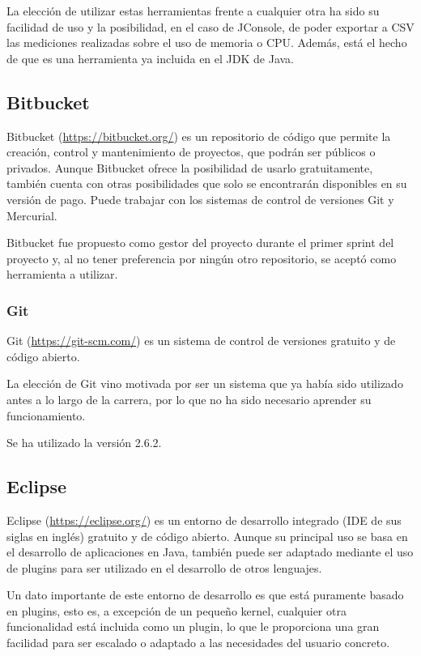 La elección de utilizar estas herramientas frente a cualquier otra ha sido su facilidad de uso y la posibilidad, en el caso de JConsole, de poder exportar a CSV las mediciones realizadas sobre el uso de memoria o CPU. Además, está el hecho de que es una herramienta ya incluida en el JDK de Java.

\subsection{Bitbucket}\label{DefBitbucket}
Bitbucket (\url{https://bitbucket.org/}) es un repositorio de código que permite la creación, control y mantenimiento de proyectos, que podrán ser públicos o privados. Aunque Bitbucket ofrece la posibilidad de usarlo gratuitamente, también cuenta con otras posibilidades que solo se encontrarán disponibles en su versión de pago. Puede trabajar con los sistemas de control de versiones Git y Mercurial.

Bitbucket fue propuesto como gestor del proyecto durante el primer sprint del proyecto y, al no tener preferencia por ningún otro repositorio, se aceptó como herramienta a utilizar.

\subsubsection{Git}

Git (\url{https://git-scm.com/}) es un sistema de control de versiones gratuito y de código abierto.

La elección de Git vino motivada por ser un sistema que ya había sido utilizado antes a lo largo de la carrera, por lo que no ha sido necesario aprender su funcionamiento.

Se ha utilizado la versión 2.6.2.

\subsection{Eclipse}
Eclipse (\url{https://eclipse.org/}) es un entorno de desarrollo integrado (IDE de sus siglas en inglés) gratuito y de código abierto. Aunque su principal uso se basa en el desarrollo de aplicaciones en Java, también puede ser adaptado mediante el uso de plugins para ser utilizado en el desarrollo de otros lenguajes.

Un dato importante de este entorno de desarrollo es que está puramente basado en plugins, esto es, a excepción de un pequeño kernel, cualquier otra funcionalidad está incluida como un plugin, lo que le proporciona una gran facilidad para ser escalado o adaptado a las necesidades del usuario concreto.

